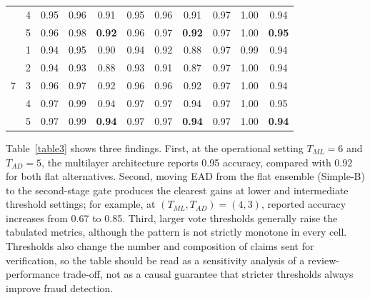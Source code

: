 \documentclass[12pt]{article}
\begin{document}
\begin{table}[H]
\begin{tabular}{rrrrrrrrrrr}
            \multicolumn{1}{c}{} & \multicolumn{1}{c}{4}& 0.95 & 0.96 & \multicolumn{1}{c}{0.91} & 0.95 & 0.96 & \multicolumn{1}{c}{0.91} & 0.97 & 1.00 & \multicolumn{1}{c}{0.94}   \\
            \multicolumn{1}{c}{} & \multicolumn{1}{c}{5}& 0.96 & 0.98 & \multicolumn{1}{c}{\textbf{0.92}} & 0.96 & 0.97 & \multicolumn{1}{c}{\textbf{0.92}} & 0.97 & 1.00 & \multicolumn{1}{c}{\textbf{0.95}}  \\
            \hline
            \multicolumn{1}{c}{\multirow{5}{*}{7}} & \multicolumn{1}{c}{1}& 0.94 & 0.95 & \multicolumn{1}{c}{0.90} & 0.94 & 0.92 & \multicolumn{1}{c}{0.88} & 0.97 & 0.99 & \multicolumn{1}{c}{0.94}  \\
            \multicolumn{1}{c}{} & \multicolumn{1}{c}{2}& 0.94 & 0.93 & \multicolumn{1}{c}{0.88} & 0.93 & 0.91 & \multicolumn{1}{c}{0.87} & 0.97 & 1.00 & \multicolumn{1}{c}{0.94}  \\
            \multicolumn{1}{c}{} & \multicolumn{1}{c}{3}& 0.96 & 0.97 & \multicolumn{1}{c}{0.92} & 0.96 & 0.96 & \multicolumn{1}{c}{0.92} & 0.97 & 1.00 & \multicolumn{1}{c}{0.94}  \\
            \multicolumn{1}{c}{} & \multicolumn{1}{c}{4}& 0.97 & 0.99 & \multicolumn{1}{c}{0.94} & 0.97 & 0.97 & \multicolumn{1}{c}{0.94} & 0.97 & 1.00 & \multicolumn{1}{c}{0.95}   \\
            \multicolumn{1}{c}{} & \multicolumn{1}{c}{5}& 0.97 & 0.99 & \multicolumn{1}{c}{\textbf{0.94}} & 0.97 & 0.97 & \multicolumn{1}{c}{\textbf{0.94}} & 0.97 & 1.00 & \multicolumn{1}{c}{\textbf{0.94}} \\
            \hline
        \end{tabular}
    \end{table}
Table~\ref{table3} shows three findings. First, at the operational setting
$T_{ML}=6$ and $T_{AD}=5$, the multilayer architecture reports 0.95 accuracy,
compared with 0.92 for both flat alternatives. Second, moving EAD from the flat
ensemble (Simple-B) to the second-stage gate produces the clearest gains at
lower and intermediate threshold settings; for example, at
$(T_{ML},T_{AD})=(4,3)$, reported accuracy increases from 0.67 to 0.85. Third,
larger vote thresholds generally raise the tabulated metrics, although the
pattern is not strictly monotone in every cell. Thresholds also change the
number and composition of claims sent for verification, so the table should be
read as a sensitivity analysis of a review-performance trade-off, not as a
causal guarantee that stricter thresholds always improve fraud detection.
\end{document}
